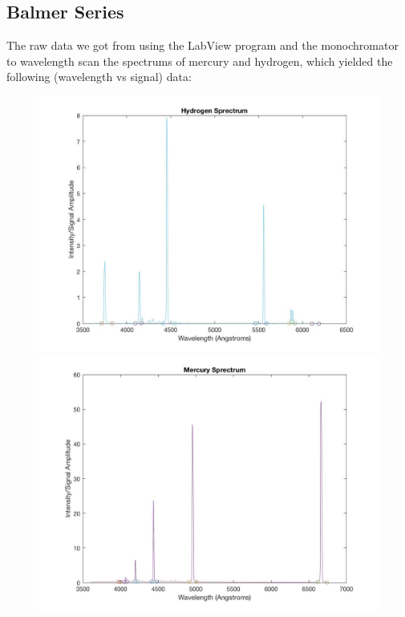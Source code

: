 \documentclass{article}
\begin{document}
    \subsection{Balmer Series}
    The raw data we got from using the LabView program and the monochromator to wavelength scan the spectrums of mercury and hydrogen, which yielded the following (wavelength vs signal) data:
    \begin{figure}[H]
    \centering
    \includegraphics[scale = 0.2]{ATMf.jpg}
    \includegraphics[scale = 0.2]{ATMg.jpg}
    \caption{}
    \label{fig:my_label}
\end{figure}
    
\end{document}
